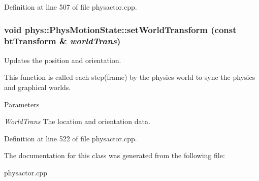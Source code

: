 Definition at line 507 of file physactor.cpp.

\hypertarget{classphys_1_1PhysMotionState_a91e372f8f474bb570e502ee42ec2deeb}{
\subsubsection[{setWorldTransform}]{\setlength{\rightskip}{0pt plus 5cm}void phys::PhysMotionState::setWorldTransform (const btTransform \& {\em worldTrans})}}
\label{dc/d0d/classphys_1_1PhysMotionState_a91e372f8f474bb570e502ee42ec2deeb}


Updates the position and orientation. 

This function is called each step(frame) by the physics world to sync the physics and graphical worlds. 
\begin{DoxyParams}{Parameters}
\item[{\em WorldTrans}]The location and orientation data. \end{DoxyParams}


Definition at line 522 of file physactor.cpp.



The documentation for this class was generated from the following file:\begin{DoxyCompactItemize}
\item 
physactor.cpp\end{DoxyCompactItemize}
